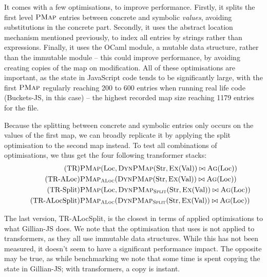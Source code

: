 It comes with a few optimisations, to improve performance. Firstly, it splits the first level $\textsc{PMap}$ entries between concrete and symbolic \emph{values}, avoiding substitutions in the concrete part. Secondly, it uses the abstract location mechanism mentioned previously, to index all entries by strings rather than expressions. Finally, it uses the OCaml  module, a mutable data structure, rather than the immutable  module -- this could improve performance, by avoiding creating copies of the map on modification. All of these optimisations are important, as the state in JavaScript code tends to be significantly large, with the first $\textsc{PMap}$ regularly reaching 200 to 600 entries when running real life code (Buckets-JS, in this case) -- the highest recorded map size reaching 1179 entries for the  file.

Because the splitting between concrete and symbolic entries only occurs on the values of the first map, we can broadly replicate it by applying the split optimisation to the second map instead. To test all combinations of optimisations, we thus get the four following transformer stacks:
\begin{align}
\tag{TR}           & \textsc{PMap}(\text{Loc}, \textsc{DynPMap}(\text{Str}, \textsc{Ex}(\text{Val})) \bowtie \textsc{Ag}(\text{Loc})) \\
\tag{TR-ALoc}      & \textsc{PMap}_{\textsc{ALoc}}(\textsc{DynPMap}(\text{Str}, \textsc{Ex}(\text{Val})) \bowtie \textsc{Ag}(\text{Loc})) \\
\tag{TR-Split}     & \textsc{PMap}(\text{Loc}, \textsc{DynPMap}_{\textsc{Split}}(\text{Str}, \textsc{Ex}(\text{Val})) \bowtie \textsc{Ag}(\text{Loc})) \\
\tag{TR-ALocSplit} & \textsc{PMap}_{\textsc{ALoc}}(\textsc{DynPMap}_{\textsc{Split}}(\text{Str}, \textsc{Ex}(\text{Val})) \bowtie \textsc{Ag}(\text{Loc}))
 \end{align}

The last version, TR-ALocSplit, is the closest in terms of applied optimisations to what Gillian-JS does. We note that the optimisation that uses  is not applied to transformers, as they all use immutable data structures. While this has not been measured, it doesn't seem to have a significant performance impact. The opposite may be true, as while benchmarking we note that some time is spent copying the state in Gillian-JS; with transformers, a copy is instant.

